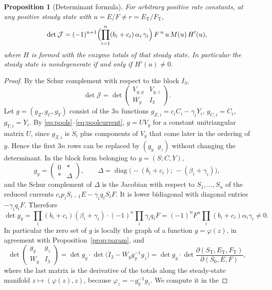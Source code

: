 \documentclass[11pt]{article}
\theoremstyle{plain}
\newtheorem{proposition}[theorem]{Proposition}
\theoremstyle{definition}
\theoremstyle{remark}
\numberwithin{equation}{section}
\newcommand{\ET}{E_{\mathrm T}}
\newcommand{\FT}{F_{\mathrm T}}
\newcommand{\ST}{S_{\mathrm T}}
\newcommand{\JS}{\mathcal J}
\begin{document}
\begin{proposition}[Determinant formula]\label{prop:det}
For arbitrary positive rate constants, at any positive steady state with \(u=E/F\ne r=\ET/\FT\),
\begin{equation}\label{eq:det}
 \det\JS=(-1)^{n+1}\Bigl(\prod_{i=1}^n(b_i+c_i)\,\alpha_i\,\gamma_i\Bigr)\,F^{\,n}\,u\,M(u)\,H'(u),
\end{equation}
where \(H\) is formed with the enzyme totals of that steady state. In particular the steady
state is nondegenerate if and only if \(H'(u)\ne0\).
\end{proposition}
\begin{proof}
By the Schur complement with respect to the block \(I_3\),
\[
 \det\JS=\det\begin{pmatrix}V_{y,y}&V_{y,z}\\ W_y&I_3\end{pmatrix}.
\]
Let \(g=(g_Z,g_C,g_Y)\) consist of the \(3n\) functions \(g_{Z,i}=c_iC_i-\gamma_iY_i\),
\(g_{C,i}=\dot C_i\), \(g_{Y,i}=\dot Y_i\). By \eqref{eq:pools}--\eqref{eq:poolcurrent},
\(g=UV_y\) for a constant unitriangular matrix \(U\), since \(g_{Z,i}\) is \(\dot S_i\) plus
components of \(V_y\) that come later in the ordering of \(y\). Hence the first \(3n\) rows can
be replaced by \((g_y\;\;g_z)\) without changing the determinant. In the block form belonging
to \(y=(S;C,Y)\),
\[
 g_y=\begin{pmatrix}0&\ast\\ \ast&\Delta\end{pmatrix},\qquad
 \Delta=\operatorname{diag}\bigl(-(b_i+c_i);\,-(\beta_i+\gamma_i)\bigr),
\]
and the Schur complement of \(\Delta\) is the Jacobian with respect to \(S_1,\dots,S_n\) of
the reduced currents \(c_ip_iS_{i-1}E-\gamma_iq_iS_iF\). It is lower bidiagonal with diagonal
entries \(-\gamma_iq_iF\). Therefore
\[
 \det g_y=\prod_i(b_i+c_i)(\beta_i+\gamma_i)\cdot(-1)^n\prod_i\gamma_iq_iF
 =(-1)^nF^n\prod_i(b_i+c_i)\alpha_i\gamma_i\ne0 .
\]
In particular the zero set of \(g\) is locally the graph of a function \(y=\varphi(z)\), in
agreement with Proposition~\ref{prop:param}, and
\[
 \det\begin{pmatrix}g_y&g_z\\ W_y&I_3\end{pmatrix}
 =\det g_y\cdot\det\bigl(I_3-W_yg_y^{-1}g_z\bigr)
 =\det g_y\cdot\det\frac{\partial(\ST,\ET,\FT)}{\partial(S_0,E,F)},
\]
where the last matrix is the derivative of the totals along the steady-state manifold
\(z\mapsto(\varphi(z),z)\), because \(\varphi_z=-g_y^{-1}g_z\). We compute it in the

\end{proof}
\end{document}
